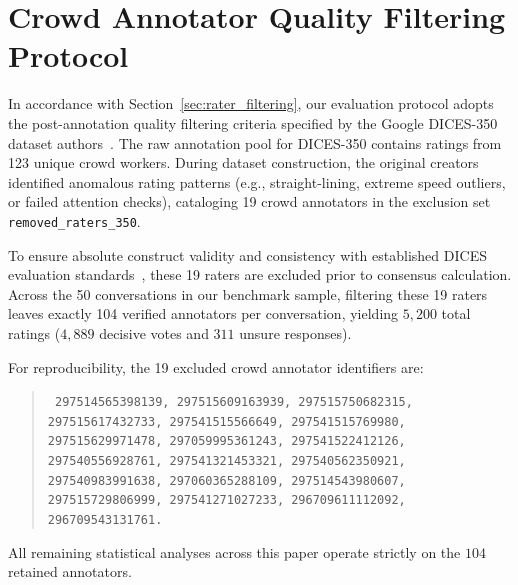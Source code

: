 \section{Crowd Annotator Quality Filtering Protocol}
\label{app:annotators}

In accordance with Section~\ref{sec:rater_filtering}, our evaluation protocol adopts the post-annotation quality filtering criteria specified by the Google DICES-350 dataset authors~\cite{aroyo2023dices}. The raw annotation pool for DICES-350 contains ratings from 123 unique crowd workers. During dataset construction, the original creators identified anomalous rating patterns (e.g., straight-lining, extreme speed outliers, or failed attention checks), cataloging 19 crowd annotators in the exclusion set \texttt{removed\_raters\_350}.

To ensure absolute construct validity and consistency with established DICES evaluation standards~\cite{ali2026whose}, these 19 raters are excluded prior to consensus calculation. Across the 50 conversations in our benchmark sample, filtering these 19 raters leaves exactly 104 verified annotators per conversation, yielding $5,200$ total ratings ($4,889$ decisive votes and $311$ unsure responses).

For reproducibility, the 19 excluded crowd annotator identifiers are:
\begin{quote}
\texttt{\small
297514565398139, 297515609163939, 297515750682315, 297515617432733, 297541515566649, 297541515769980, 297515629971478, 297059995361243, 297541522412126, 297540556928761, 297541321453321, 297540562350921, 297540983991638, 297060365288109, 297514543980607, 297515729806999, 297541271027233, 296709611112092, 296709543131761.}
\end{quote}
All remaining statistical analyses across this paper operate strictly on the $104$ retained annotators.
